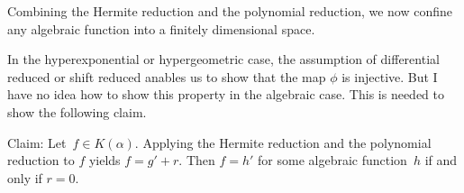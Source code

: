 \documentclass[a4paper,draft]{article}
\begin{document}
{Combining the Hermite reduction and the polynomial reduction, we now confine any algebraic function
into a finitely dimensional space.

In the hyperexponential or hypergeometric case, the assumption of differential reduced or shift reduced anables
us to show that the map $\phi$ is injective. But I have no idea how to show this property in the algebraic case.
This is needed to show the following claim.

{Claim: Let~$f\in K(\alpha)$. Applying the Hermite reduction and the polynomial reduction to $f$ yields $f = g' + r$.
Then $f= h'$ for some algebraic function~$h$ if and only if $r=0$. }











 }
\end{document}
